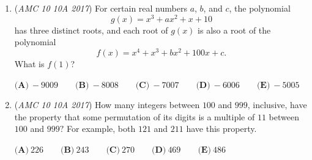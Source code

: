 \begin{enumerate}
 $\textbf{(A)}\ 2128 \qquad\textbf{(B)}\ 2148 \qquad\textbf{(C)}\ 2160 \qquad\textbf{(D)}\ 2200 \qquad\textbf{(E)}\ 2300$


	\item (\textit{AMC 10 10A 2017}) For certain real numbers $a$, $b$, and $c$, the polynomial 
 \[g(x) = x^3 + ax^2 + x + 10\]has three distinct roots, and each root of $g(x)$ is also a root of the polynomial 
 \[f(x) = x^4 + x^3 + bx^2 + 100x + c.\]What is $f(1)$?


 $\textbf{(A)}\ -9009\qquad\textbf{(B)}\ -8008\qquad\textbf{(C)}\ -7007\qquad\textbf{(D)}\ -6006\qquad\textbf{(E)}\ -5005$


	\item (\textit{AMC 10 10A 2017}) How many integers between $100$ and $999$, inclusive, have the property that some permutation of its digits is a multiple of $11$ between $100$ and $999?$ For example, both $121$ and $211$ have this property.


 $\textbf{(A)}\ 226\qquad\textbf{(B)}\ 243\qquad\textbf{(C)}\ 270\qquad\textbf{(D)}\ 469\qquad\textbf{(E)}\ 486$


\end{enumerate}